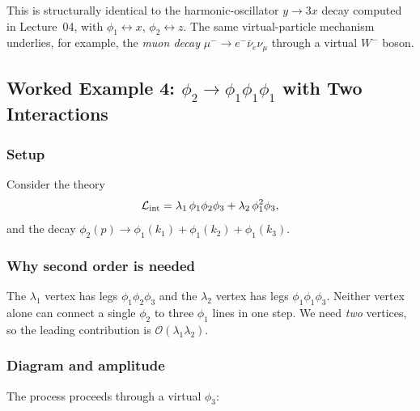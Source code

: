 \documentclass[../main.tex]{subfiles}
\begin{document}
\begin{remark}
This is structurally identical to the harmonic-oscillator $y \to 3x$ decay computed in Lecture~04, with $\phi_1 \leftrightarrow x$, $\phi_2 \leftrightarrow z$.  The same virtual-particle mechanism underlies, for example, the \emph{muon decay} $\mu^- \to e^- \bar\nu_e \nu_\mu$ through a virtual $W^-$ boson.
\end{remark}

\subsection*{Worked Example 4: $\phi_2 \to \phi_1\phi_1\phi_1$ with Two Interactions}

\subsubsection*{Setup}

Consider the theory
\begin{equation}
  \mathcal{L}_{\rm int} = \lambda_1\,\phi_1\phi_2\phi_3 + \lambda_2\,\phi_1^2\phi_3,
  \label{eq:lec05:two-vertex-lag}
\end{equation}
and the decay $\phi_2(p) \to \phi_1(k_1) + \phi_1(k_2) + \phi_1(k_3)$.

\subsubsection*{Why second order is needed}

The $\lambda_1$ vertex has legs $\phi_1\phi_2\phi_3$ and the $\lambda_2$ vertex has legs $\phi_1\phi_1\phi_3$.  Neither vertex alone can connect a single $\phi_2$ to three $\phi_1$ lines in one step.  We need \emph{two} vertices, so the leading contribution is $\mathcal{O}(\lambda_1\lambda_2)$.

\subsubsection*{Diagram and amplitude}

The process proceeds through a virtual $\phi_3$:

\begin{center}
\end{center}
\end{document}
